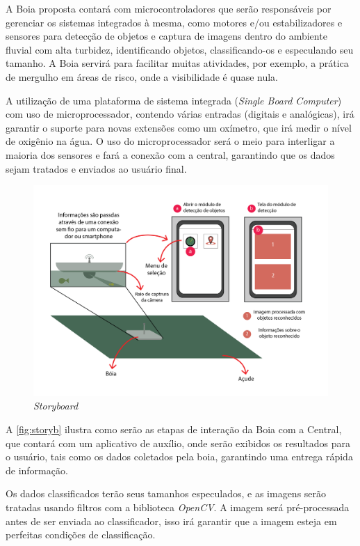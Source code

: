 A Boia proposta contará com microcontroladores que serão responsáveis por gerenciar os sistemas integrados à mesma, como motores e/ou estabilizadores e sensores para detecção de objetos e captura de imagens dentro do ambiente fluvial com alta turbidez, identificando objetos, classificando-os e especulando seu tamanho. A Boia servirá para facilitar muitas atividades, por exemplo, a prática de mergulho em áreas de risco, onde a visibilidade é quase nula.

A utilização de uma plataforma de sistema integrada (\textit{Single Board Computer}) com uso de microprocessador, contendo várias entradas (digitais e analógicas), irá garantir o suporte para novas extensões como um oxímetro, que irá medir o nível de oxigênio na água. O uso do microprocessador será o meio para interligar a maioria dos sensores e fará a conexão com a central, garantindo que os dados sejam tratados e enviados ao usuário final.


\begin{figure}[ht]
	\centering
    \caption{\label{fig:storyb}\textit{Storyboard}}
	\includegraphics[width = 1 \textwidth]{resources/storyboard.png}
\end{figure}

A \autoref{fig:storyb} ilustra como serão as etapas de interação da Boia com a Central, que contará com um aplicativo de auxílio, onde serão exibidos os resultados para o usuário, tais como os dados coletados pela boia, garantindo uma entrega rápida de informação. 

Os dados classificados terão seus tamanhos especulados, e as imagens serão tratadas usando filtros com a biblioteca \textit{OpenCV}. A imagem será pré-processada antes de ser enviada ao classificador, isso irá garantir que a imagem esteja em perfeitas condições de classificação.


